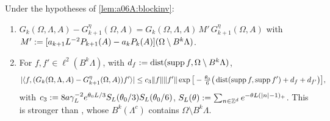 
\begin{lemma}\label{lem:a06A:resdiff}
Under the hypotheses of \cref{lem:a06A:blockinv}:
\begin{enumerate}[label=\textup{(\alph*)},nosep,leftmargin=*]
\item $G_k(\Omega,\Lambda,A)-G^\eta_{k+1}(\Omega,A)=G_k(\Omega,\Lambda,A)\,M'\,G^\eta_{k+1}(\Omega,A)$ with $M':=[a_{k+1}L^{-2}P_{k+1}(A)-a_kP_k(A)](\Omega\setminus B^k\Lambda)$.
\item For $f,f'\in\ell^2(B^k\Lambda)$, with $d_f:=\operatorname{dist}(\operatorname{supp} f,\Omega\setminus B^k\Lambda)$,
\[
|\langle f,(G_k(\Omega,\Lambda,A)-G^\eta_{k+1}(\Omega,A))f'\rangle|\le c_3\lVert f\rVert\lVert f'\rVert\exp\big[-\tfrac{\theta_0}6\big(\operatorname{dist}(\operatorname{supp} f,\operatorname{supp} f')+d_f+d_{f'}\big)\big],
\]
with $c_3:=8a\gamma_L^{-2}e^{\theta_0L/3}S_L(\theta_0/3)S_L(\theta_0/6)$, $S_L(\theta):=\sum_{n\in\mathbb Z^d}e^{-\theta L(|n|-1)_+}$. This is stronger than \cite[(3.10)]{Ba4}, whose $B^k(\Lambda^c)$ contains $\Omega\setminus B^k\Lambda$.
\end{enumerate}
\end{lemma}

